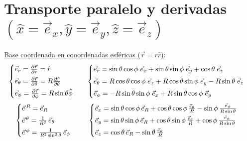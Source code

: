 \section*{Transporte paralelo y derivadas $(\hat{x}=\vec{e}_x, \hat{y}=\vec{e}_y, \hat{z}=\vec{e}_z)$}
\underline{Base coordenada en cooordenadas esféricas ($\vec{r}= r\hat{r}$)}:
\begin{align*}
    &\begin{cases} 
\vec{e}_r= \frac{\partial \vec{r}}{\partial r}=\hat{r}\vspace{3pt} \\ 
\vec{e}_{\theta}= \frac{\partial \vec{r}}{\partial \theta} = R\frac{\partial \hat{r}}{\partial \theta }\vspace{3pt} \\ 
\vec{e}_\phi = \frac{\partial \vec{r}}{\partial \phi}= R\sin \theta \hat{\phi}
\end{cases}&\begin{cases} 
\vec{e}_r= \sin\theta  \cos \phi \; \vec{e}_x +\sin\theta\sin \phi\; \vec{e}_y + \cos \theta \; \vec{e}_z\vspace{3pt} \\ 
\vec{e}_{\theta}=R\cos\theta \cos \phi \; \vec{e}_x  + R \cos \theta \sin\phi \; \vec{e}_y - R \sin \theta \; \vec{e}_z\vspace{3pt}\\ 
\vec{e}_\phi = - R \sin \theta \sin \phi \; \vec{e}_x + R \sin \theta \cos \phi \; \vec{e}_y
\end{cases}
\end{align*}
\vspace{-6pt}
\begin{align*}
&
\begin{cases} 
\vec{e}^{\,R} = \vec{e}_R \vspace{3pt}\\
\vec{e}^{\,\theta} = \frac{1}{R^2}\, \vec{e}_\theta \vspace{3pt}\\
\vec{e}^{\,\phi} = \frac{1}{R^2 \sin^2\theta}\, \vec{e}_\phi\; \; 
\end{cases}
&\begin{cases} 
\vec{e}_x = \sin\theta \cos\phi\, \vec{e}_R + \cos\theta \cos\phi\, \frac{\vec{e}_\theta}{R} - \sin\phi\, \frac{\vec{e}_\phi}{R \sin\theta} \vspace{3pt}\\
 \vec{e}_y = \sin\theta \sin\phi\, \vec{e}_R + \cos\theta \sin\phi\, \frac{\vec{e}_\theta}{R} + \cos\phi\, \frac{\vec{e}_\phi}{R \sin\theta} \vspace{3pt}\\
\vec{e}_z = \cos\theta\, \vec{e}_R - \sin\theta\, \frac{\vec{e}_\theta}{R}
\end{cases}
\end{align*}
